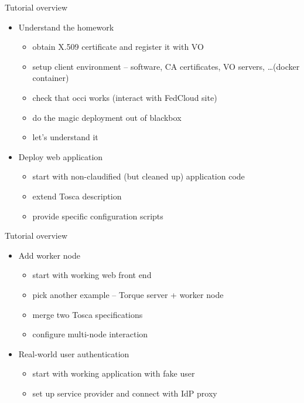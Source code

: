 \documentclass[smaller,t]{beamer}
\begin{document}
\begin{frame}{Tutorial overview}
\begin{itemize}
\item Understand the homework 
\begin{itemize}
\item obtain X.509 certificate and register it with VO
\item setup client environment -- software, CA certificates, VO servers, \dots (docker container)
\item check that occi works (interact with FedCloud site)
\item do the magic deployment out of blackbox 
\item \alert{let's understand it}
\end{itemize}
\item Deploy web application 
\begin{itemize}
\item start with non-claudified (but cleaned up) application code
\item \alert{extend Tosca description}
\item \alert{provide specific configuration scripts}
\end{itemize}
\end{itemize}
\end{frame}

\begin{frame}{Tutorial overview}
\begin{itemize}
\item Add worker node
\begin{itemize}
\item start with working web front end
\item pick another example -- Torque server + worker node
\item \alert{merge two Tosca specifications}
\item \alert{configure multi-node interaction}
\end{itemize}
\item Real-world user authentication
\begin{itemize}
\item start with working application with fake user
\item \alert{set up service provider and connect with IdP proxy}
\end{itemize}
\end{itemize}
\end{frame}
\end{document}
